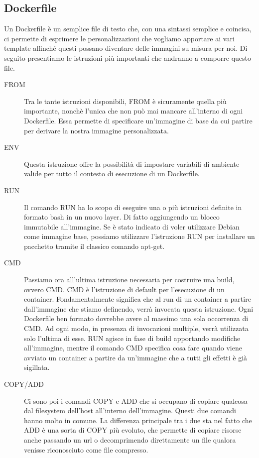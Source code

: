 \subsection{Dockerfile}
Un Dockerfile è un semplice file di testo che, con una sintassi semplice e coincisa, ci permette di esprimere le personalizzazioni che vogliamo apportare ai vari template affinché questi possano diventare delle immagini su misura per noi. 
Di seguito presentiamo le istruzioni più importanti che andranno a comporre questo file.
\begin{description} 
\item[FROM] Tra le tante istruzioni disponibili, FROM è sicuramente quella più importante, nonchè l'unica che non può mai mancare all'interno di ogni Dockerfile. Essa permette di specificare un'immagine di base da cui partire per derivare la nostra immagine personalizzata.
\item[ENV]  Questa istruzione offre la possibilità di impostare variabili di ambiente valide per tutto il contesto di esecuzione di un Dockerfile.
 \item[RUN] Il comando RUN ha lo scopo di eseguire una o più istruzioni definite in formato bash in un nuovo layer. Di fatto aggiungendo un blocco immutabile all’immagine. Se è stato indicato di voler utilizzare Debian come immagine base, possiamo utilizzare l'istruzione RUN per installare un pacchetto tramite il classico comando apt-get.
 \item [CMD] Passiamo ora all’ultima istruzione necessaria per costruire una build, ovvero CMD. CMD è l’istruzione di default per l’esecuzione di un container. Fondamentalmente significa che al run di un container a partire dall’immagine che stiamo definendo, verrà invocata questa istruzione. Ogni Dockerfile ben formato dovrebbe avere al massimo una sola occorrenza di CMD. Ad ogni modo, in presenza di invocazioni multiple, verrà utilizzata solo l’ultima di esse. RUN agisce in fase di build apportando modifiche all’immagine, mentre il comando CMD specifica cosa fare quando viene avviato un container a partire da un’immagine che a tutti gli effetti è già sigillata.
 \item [COPY/ADD] Ci sono poi i comandi COPY e ADD che si occupano di copiare qualcosa dal filesystem dell’host all’interno dell’immagine. Questi due comandi hanno molto in comune. La differenza principale tra i due sta nel fatto che ADD è una sorta di COPY più evoluto, che permette di copiare risorse anche passando un url o decomprimendo direttamente un file qualora venisse riconosciuto come file compresso. 

\end{description}
